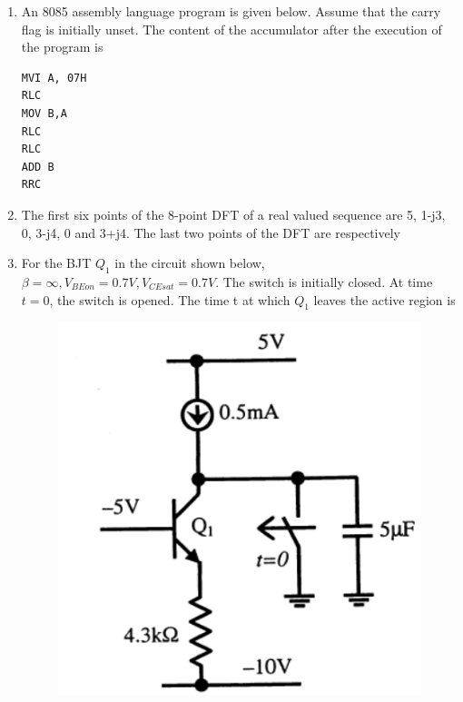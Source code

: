 \documentclass[a4paper, 11pt]{article}
\begin{document}
\begin{enumerate}
    \hfill{}

    \item An 8085 assembly language program is given below. Assume that the carry flag is initially unset. The content of the accumulator after the execution of the program is
    
    \begin{lstlisting}
MVI A, 07H
RLC
MOV B,A
RLC
RLC
ADD B
RRC
    \end{lstlisting}
    
    \begin{enumerate}
    \end{enumerate}

    \hfill{}

    \item The first six points of the 8-point DFT of a real valued sequence are 5, 1-j3, 0, 3-j4, 0 and 3+j4. The last two points of the DFT are respectively
    
    \begin{enumerate}
    \end{enumerate}
    
    \hfill{}

    \item For the BJT $Q_{1}$ in the circuit shown below, $\beta=\infty, V_{BEon}=0.7V, V_{CEsat}=0.7V$. The switch is initially closed. At time $t=0$, the switch is opened. The time t at which $Q_{1}$ leaves the active region is
    
    \begin{figure}[H]
        \centering
        \includegraphics[width=0.4\columnwidth]{figs/q32.png}
        \caption*{}
        \label{fig:q32}
    \end{figure}
    

\end{enumerate}
\end{document}
